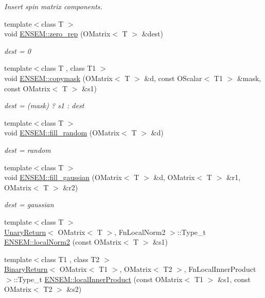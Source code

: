 \begin{DoxyCompactItemize}
\begin{DoxyCompactList}\small\item\em Insert spin matrix components. \end{DoxyCompactList}\item 
{\footnotesize template$<$class T $>$ }\\void \mbox{\hyperlink{group__obsmatrix_gaf3d502e6c7fccd147d8023eda09b31b4}{E\+N\+S\+E\+M\+::zero\+\_\+rep}} (O\+Matrix$<$ T $>$ \&dest)
\begin{DoxyCompactList}\small\item\em dest = 0 \end{DoxyCompactList}\item 
{\footnotesize template$<$class T , class T1 $>$ }\\void \mbox{\hyperlink{group__obsmatrix_gaa09c3011b1e6555dcc6e4f9b51d1f5de}{E\+N\+S\+E\+M\+::copymask}} (O\+Matrix$<$ T $>$ \&d, const O\+Scalar$<$ T1 $>$ \&mask, const O\+Matrix$<$ T $>$ \&s1)
\begin{DoxyCompactList}\small\item\em dest = (mask) ? s1 \+: dest \end{DoxyCompactList}\item 
{\footnotesize template$<$class T $>$ }\\void \mbox{\hyperlink{group__obsmatrix_ga3fed53cf2a765d06a2ba3d79f2516f35}{E\+N\+S\+E\+M\+::fill\+\_\+random}} (O\+Matrix$<$ T $>$ \&d)
\begin{DoxyCompactList}\small\item\em dest = random \end{DoxyCompactList}\item 
{\footnotesize template$<$class T $>$ }\\void \mbox{\hyperlink{group__obsmatrix_ga5abeb3bfc7329fc57387aefff992eb94}{E\+N\+S\+E\+M\+::fill\+\_\+gaussian}} (O\+Matrix$<$ T $>$ \&d, O\+Matrix$<$ T $>$ \&r1, O\+Matrix$<$ T $>$ \&r2)
\begin{DoxyCompactList}\small\item\em dest = gaussian \end{DoxyCompactList}\item 
{\footnotesize template$<$class T $>$ }\\\mbox{\hyperlink{structUnaryReturn}{Unary\+Return}}$<$ O\+Matrix$<$ T $>$, Fn\+Local\+Norm2 $>$\+::Type\+\_\+t \mbox{\hyperlink{group__obsmatrix_ga13d075f8a50ffa95c7a8a7fa61fe8028}{E\+N\+S\+E\+M\+::local\+Norm2}} (const O\+Matrix$<$ T $>$ \&s1)
\item 
{\footnotesize template$<$class T1 , class T2 $>$ }\\\mbox{\hyperlink{structBinaryReturn}{Binary\+Return}}$<$ O\+Matrix$<$ T1 $>$, O\+Matrix$<$ T2 $>$, Fn\+Local\+Inner\+Product $>$\+::Type\+\_\+t \mbox{\hyperlink{group__obsmatrix_ga53af10b5c51df2876f7569d4691cbd0d}{E\+N\+S\+E\+M\+::local\+Inner\+Product}} (const O\+Matrix$<$ T1 $>$ \&s1, const O\+Matrix$<$ T2 $>$ \&s2)

\end{DoxyCompactItemize}

